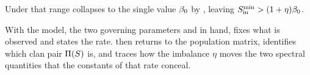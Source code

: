 \noindent Under  that range collapses to
the single value $\beta_0$ by , leaving $S_{\mathrm{in}}^{\min}>(1+\eta)\beta_0$.

\noindent With the model, the two governing parameters and  in hand,
 fixes what is observed and  states the rate.
 then returns to the population matrix, identifies which clan pair
$\Pi(S)$ is, and traces how the imbalance $\eta$ moves the two spectral quantities
that the constants of that rate conceal.
